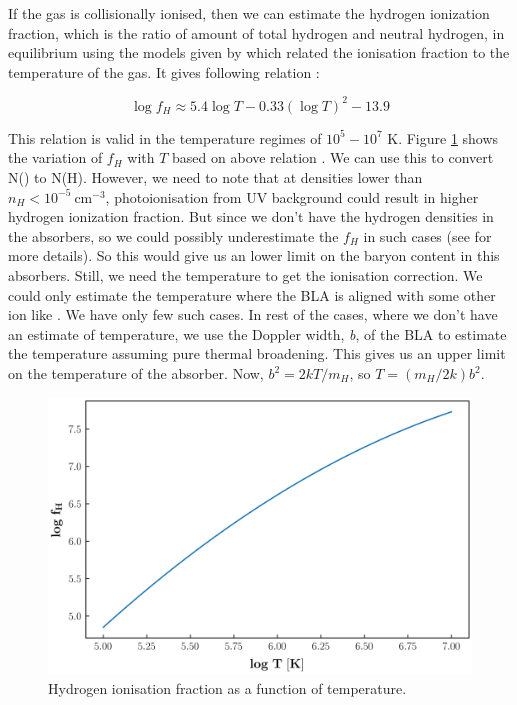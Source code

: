 If the gas is collisionally ionised, then we can estimate the hydrogen ionization fraction, which is the ratio of amount of total hydrogen and neutral hydrogen, in equilibrium using the models given by \citet{Sutherland-1993} which related the ionisation fraction to the temperature of the gas. It gives following relation :

\begin{equation} 
    \log f_H \approx 5.4 \log T - 0.33(\log T)^2 -13.9
\end{equation}

This relation is valid in the temperature regimes of $10^5-10^7$ K. Figure \ref{fig:fH} shows the variation of $f_H$ with $T$ based on above relation . We can use this to convert N() to N(H). However, we need to note that at densities lower than $n_H < 10^{-5} \ \text{cm}^{-3}$, photoionisation from UV background could result in higher hydrogen ionization fraction. But since we don't have the hydrogen densities in the absorbers, so we could possibly underestimate the $f_H$ in such cases (see \citet{Richter_2020, Fang-2001} for more details). So this would give us an lower limit on the baryon content in this absorbers. Still, we need the temperature to get the ionisation correction. We could only estimate the temperature where the BLA is aligned with some other ion like . We have only few such cases. In rest of the cases, where we don't have an estimate of temperature, we use the Doppler width, \emph{b}, of the BLA to estimate the temperature assuming pure thermal broadening. This gives us an upper limit on the temperature of the absorber. Now, $b^2=2kT/m_H$, so $T=(m_H / 2k) b^2 $. 

\begin{figure}[t]
    \centering
    \includegraphics[width=\linewidth,draft=False]{Figures/fH_vs_T.png}
    \caption{Hydrogen ionisation fraction as a function of temperature.}
    \label{fig:fH}
\end{figure}

